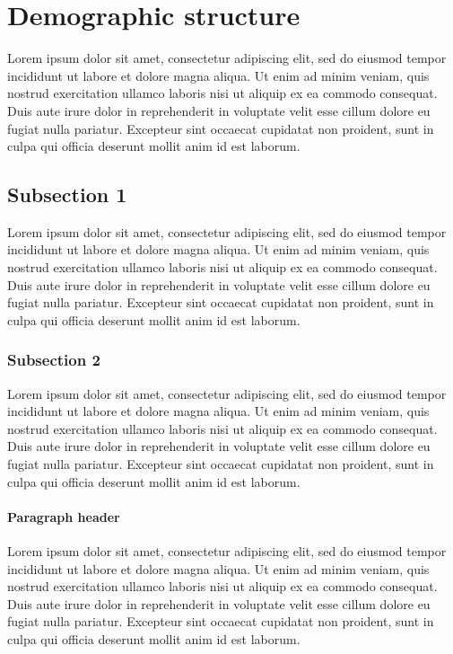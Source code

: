 \documentclass[nogrid]{MBE}%
\begin{document}
\section{Demographic structure}

Lorem ipsum dolor sit amet, consectetur adipiscing elit, sed do eiusmod tempor incididunt ut labore et dolore magna aliqua. Ut enim ad minim veniam, quis nostrud exercitation ullamco laboris nisi ut aliquip ex ea commodo consequat. Duis aute irure dolor in reprehenderit in voluptate velit esse cillum dolore eu fugiat nulla pariatur. Excepteur sint occaecat cupidatat non proident, sunt in culpa qui officia deserunt mollit anim id est laborum.

\subsection{Subsection 1}

Lorem ipsum dolor sit amet, consectetur adipiscing elit, sed do eiusmod tempor incididunt ut labore et dolore magna aliqua. Ut enim ad minim veniam, quis nostrud exercitation ullamco laboris nisi ut aliquip ex ea commodo consequat. Duis aute irure dolor in reprehenderit in voluptate velit esse cillum dolore eu fugiat nulla pariatur. Excepteur sint occaecat cupidatat non proident, sunt in culpa qui officia deserunt mollit anim id est laborum.


\subsubsection{Subsection 2}

Lorem ipsum dolor sit amet, consectetur adipiscing elit, sed do eiusmod tempor incididunt ut labore et dolore magna aliqua. Ut enim ad minim veniam, quis nostrud exercitation ullamco laboris nisi ut aliquip ex ea commodo consequat. Duis aute irure dolor in reprehenderit in voluptate velit esse cillum dolore eu fugiat nulla pariatur. Excepteur sint occaecat cupidatat non proident, sunt in culpa qui officia deserunt mollit anim id est laborum.


\paragraph{Paragraph header} 

Lorem ipsum dolor sit amet, consectetur adipiscing elit, sed do eiusmod tempor incididunt ut labore et dolore magna aliqua. Ut enim ad minim veniam, quis nostrud exercitation ullamco laboris nisi ut aliquip ex ea commodo consequat. Duis aute irure dolor in reprehenderit in voluptate velit esse cillum dolore eu fugiat nulla pariatur. Excepteur sint occaecat cupidatat non proident, sunt in culpa qui officia deserunt mollit anim id est laborum.
\end{document}
